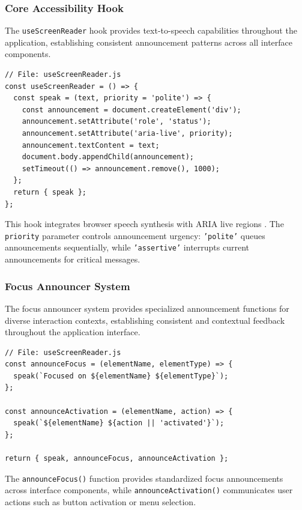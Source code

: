 \subsubsection{Core Accessibility Hook}

The \texttt{useScreenReader} hook provides text-to-speech capabilities throughout the application, establishing consistent announcement patterns across all interface components.

\begin{lstlisting}[caption={Core useScreenReader hook implementation}, label={lst:hook-sr}]
// File: useScreenReader.js
const useScreenReader = () => {
  const speak = (text, priority = 'polite') => {
    const announcement = document.createElement('div');
    announcement.setAttribute('role', 'status');
    announcement.setAttribute('aria-live', priority);
    announcement.textContent = text;
    document.body.appendChild(announcement);
    setTimeout(() => announcement.remove(), 1000);
  };
  return { speak };
};
\end{lstlisting}

This hook integrates browser speech synthesis with ARIA live regions \cite{WCAG22}. The \texttt{priority} parameter controls announcement urgency: \texttt{'polite'} queues announcements sequentially, while \texttt{'assertive'} interrupts current announcements for critical messages.

\subsubsection{Focus Announcer System}

The focus announcer system provides specialized announcement functions for diverse interaction contexts, establishing consistent and contextual feedback throughout the application interface.

\begin{lstlisting}[caption={Focus announcement functions}, label={lst:focus-announcer}]
// File: useScreenReader.js
const announceFocus = (elementName, elementType) => {
  speak(`Focused on ${elementName} ${elementType}`);
};

const announceActivation = (elementName, action) => {
  speak(`${elementName} ${action || 'activated'}`);
};

return { speak, announceFocus, announceActivation };
\end{lstlisting}

The \texttt{announceFocus()} function provides standardized focus announcements across interface components, while \texttt{announceActivation()} communicates user actions such as button activation or menu selection.

